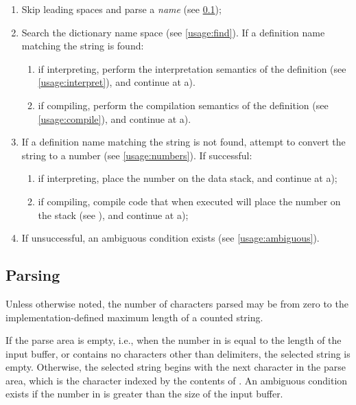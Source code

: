 \begin{enumerate}
\item Skip leading spaces and parse a \emph{name}
	(see \ref{usage:parsing});

\item Search the dictionary name space (see \ref{usage:find}).
	If a definition name matching the string is found:

	\begin{enumerate}
	\item if interpreting, perform the interpretation semantics of
		the definition (see \ref{usage:interpret}), and continue at
		a).

	\item if compiling, perform the compilation semantics of the
		definition (see \ref{usage:compile}), and continue at a).
	\end{enumerate}

\item If a definition name matching the string is not found,
	attempt to convert the string to a number
	(see \ref{usage:numbers}). If successful:
	\begin{enumerate}
	\item if interpreting, place the number on the data stack,
		and continue at a);
	\item if compiling, compile code that when executed will place
		the number on the stack (see ),
		and continue at a);
	\end{enumerate}

\item If unsuccessful, an ambiguous condition exists
	(see \ref{usage:ambiguous}).
\end{enumerate}

\subsection{Parsing} %
\label{usage:parsing}

Unless otherwise noted, the number of characters parsed may be from
zero to the implementation-defined maximum length of a counted
string.

If the parse area is empty, i.e., when the number in  is
equal to the length of the input buffer, or contains no characters
other than delimiters, the selected string is empty. Otherwise, the
selected string begins with the next character in the parse area,
which is the character indexed by the contents of . An
ambiguous condition exists if the number in  is greater
than the size of the input buffer.

